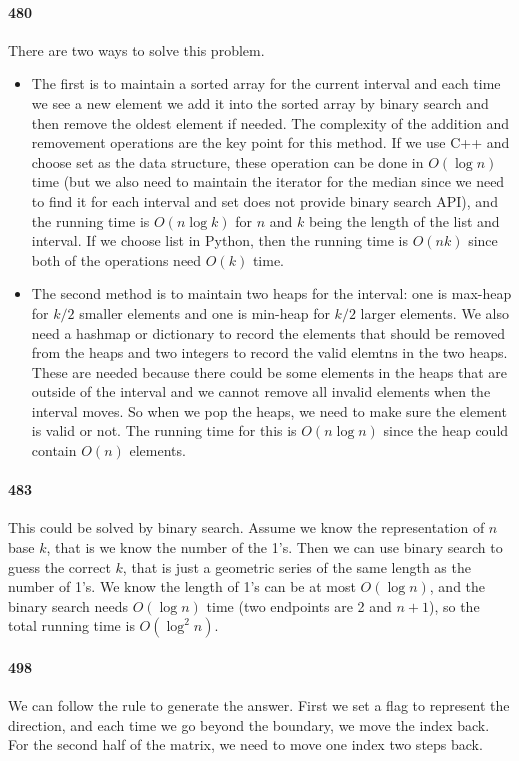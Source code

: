 \documentclass[11pt]{article}
\begin{document}
\begin{itemize}
\paragraph{480}
There are two ways to solve this problem. 
\begin{itemize}
\item The first is to maintain a sorted array for the current interval and each time we 
see a new element we add it into the sorted array by binary search and then remove the oldest element if needed. 
The complexity of the addition and removement operations are the key point for this method. If we use C++ and choose set
as the data structure, these operation can be done in $O(\log n)$ time (but we also need to maintain the iterator for the 
median since we need to find it for each interval and set does not provide binary search API), and the running time is 
$O(n\log k)$ for $n$ and $k$ being the length of the list and interval. If we choose list in Python, then the running time 
is $O(nk)$ since both of the operations need $O(k)$ time.

\item The second method is to maintain two heaps for the interval: one is max-heap for $k/2$ smaller elements and one is min-heap
for $k/2$ larger elements. We also need a hashmap or dictionary to record the elements that should be removed from the heaps and 
two integers to record the valid elemtns in the two heaps. These are needed because there could be some elements in the heaps
that are outside of the interval and we cannot remove all invalid elements when the interval moves. 
So when we pop the heaps, we need to make sure the element is valid or not. 
The running time for this is $O(n \log n)$ since the heap could contain $O(n)$ elements.
\end{itemize}

\paragraph{483}
This could be solved by binary search. Assume we know the representation of $n$ base $k$, that is we know the number of 
the 1's. Then we can use binary search to guess the correct $k$, that is just a geometric series of the same length as the
number of 1's. We know the length of 1's can be at most $O(\log n)$, and the binary search needs $O(\log n)$ time (two 
endpoints are 2 and $n+1$), so the total running time is $O(\log ^2 n)$.

\paragraph{498}
We can follow the rule to generate the answer. First we set a flag to represent the direction, and each time we go beyond the 
boundary, we move the index back. For the second half of the matrix, we need to move one index two steps back.


\end{itemize}
\end{document}

